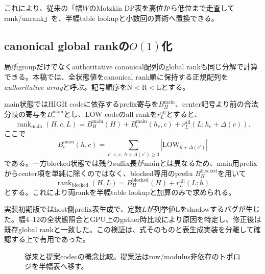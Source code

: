 \documentclass[a4paper,10pt,twocolumn]{ltjsarticle}
\newcommand{\R}{\mathrm{R}}
\newcommand{\Lsym}{\mathrm{L}}
\newcommand{\Nsym}{\mathrm{N}}
\newcommand{\low}{\mathrm{LOW}}
\newcommand{\main}{\mathrm{main}}
\newcommand{\block}{\mathrm{blocked}}
\newcommand{\rank}{\operatorname{rank}}
\newcommand{\unrank}{\operatorname{unrank}}
\begin{document}
これにより、従来の「幅$W$のMotzkin DP表を高位から低位まで走査してrank/unrank」を、半幅table lookupと小数回の算術へ置換できる。

\subsection{canonical global rankの$O(1)$化}
局所groupだけでなくauthoritative canonical配列のglobal rankも同じ分解で計算できる。本稿では、全状態値をcanonical rank順に保持する正規配列を\emph{authoritative array}と呼ぶ。記号順序を$\Nsym<\R<\Lsym$とする。

main状態ではHIGH codeに依存するprefix寄与を$B_H^{\main}$、center記号より前の合法分岐の寄与を$B_c^{\main}$とし、LOW codeのall rankを$r_L^{\mathrm{all}}$とすると、
\begin{equation}
\rank_{\main}(H,c,L)
=B_H^{\main}(H)+B_c^{\main}(h_e,c)
+r_L^{\mathrm{all}}(L;h_e+\Delta(c)).
\label{eq:globalrank-main}
\end{equation}
ここで
\begin{equation}
B_c^{\main}(h,c)
=\sum_{c'<c,\;h+\Delta(c')\ge0}
|\low_{h+\Delta(c')}|
\end{equation}
である。一方blocked状態では残りsuffix長がmainとは異なるため、main用prefixからcenter項を単純に除くのではなく、blocked専用のprefix $B_H^{\block}$を用いて
\begin{equation}
\rank_{\block}(H,L)
=B_H^{\block}(H)+r_L^{\mathrm{all}}(L;h)
\label{eq:globalrank-block}
\end{equation}
とする。これにより両rankを半幅table lookupと加算のみで求められる。

実装初期版ではhost側prefix表生成で、定数$L$が列挙値$\Lsym$をshadowするバグが生じた。幅4--12の全状態照合とGPU上のgather時比較により原因を特定し、修正後は既存global rankと一致した。この検証は、式そのものと表生成実装を分離して確認する上で有用であった。

\begin{figure}[t]
\centering
{}
\caption{従来と提案codecの概念比較。提案法はrow/modulus非依存のトポロジを半幅表へ移す。}
\label{fig:codec}
\end{figure}
\end{document}

